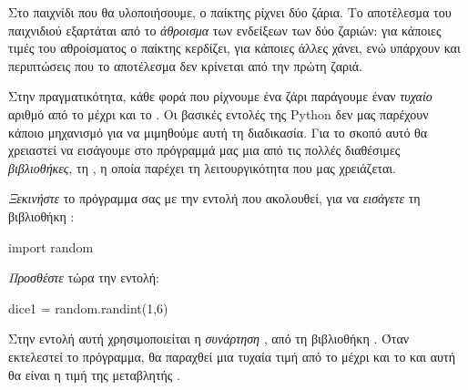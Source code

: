 \documentclass[a4paper,11pt,oneside]{book}
\begin{document}


Στο παιχνίδι που θα υλοποιήσουμε, ο παίκτης ρίχνει δύο ζάρια. Το αποτέλεσμα του παιχνιδιού εξαρτάται από το \emph{άθροισμα} των ενδείξεων των δύο ζαριών: για κάποιες τιμές του αθροίσματος ο παίκτης κερδίζει, για κάποιες άλλες χάνει, ενώ υπάρχουν και περιπτώσεις που το αποτέλεσμα δεν κρίνεται από την πρώτη ζαριά.

Στην πραγματικότητα, κάθε φορά που ρίχνουμε ένα ζάρι παράγουμε έναν \emph{τυχαίο} αριθμό από το  μέχρι και το . Οι βασικές εντολές της Python δεν μας παρέχουν κάποιο μηχανισμό για να μιμηθούμε αυτή τη διαδικασία.
Για το σκοπό αυτό θα χρειαστεί να εισάγουμε στο πρόγραμμά μας μια από τις πολλές διαθέσιμες \emph{βιβλιοθήκες}, τη , η οποία παρέχει τη λειτουργικότητα που μας χρειάζεται.

\clearpage
\begin{step}
\emph{Ξεκινήστε} το πρόγραμμα σας με την εντολή που ακολουθεί, για να \emph{εισάγετε} τη βιβλιοθήκη :

\begin{pynew}
import random
\end{pynew}

\emph{Προσθέστε} τώρα την εντολή:

\begin{pynew}
dice1 = random.randint(1,6)
\end{pynew}

Στην εντολή αυτή χρησιμοποιείται η \emph{συνάρτηση} , από τη βιβλιοθήκη .
Όταν εκτελεστεί το πρόγραμμα, θα παραχθεί μια τυχαία τιμή από το  μέχρι και το  και αυτή θα είναι η τιμή της μεταβλητής .

\end{step}
\end{document}
